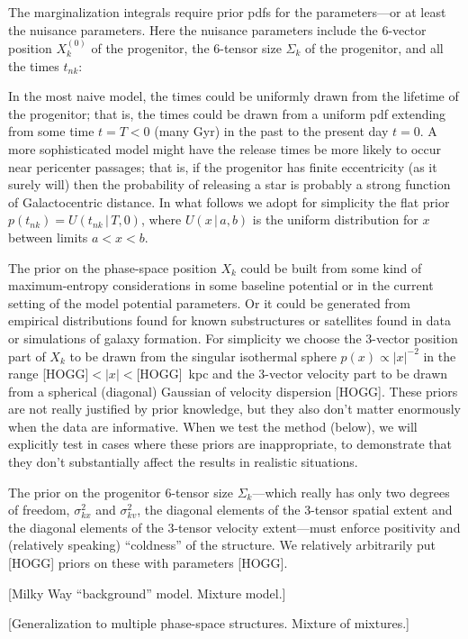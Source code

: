 \documentclass[letterpaper,12pt,preprint]{aastex}
\newcommand{\given}{\,|\,}
\begin{document}
The marginalization integrals require prior pdfs for the
parameters---or at least the nuisance parameters.  Here the nuisance
parameters include the 6-vector position $X_k^{(0)}$ of the
progenitor, the 6-tensor size $\Sigma_k$ of the progenitor, and all
the times $t_{nk}$:

In the most naive model, the times could be uniformly drawn from the
lifetime of the progenitor; that is, the times could be drawn from a
uniform pdf extending from some time $t=T<0$ (many Gyr) in the past to
the present day $t=0$.  A more sophisticated model might have the
release times be more likely to occur near pericenter passages; that
is, if the progenitor has finite eccentricity (as it surely will) then
the probability of releasing a star is probably a strong function of
Galactocentric distance.  In what follows we adopt for simplicity the
flat prior $p(t_{nk})=U(t_{nk}\given T,0)$, where $U(x\given a,b)$ is
the uniform distribution for $x$ between limits $a<x<b$.

The prior on the phase-space position $X_k$ could be built from some
kind of maximum-entropy considerations in some baseline potential or
in the current setting of the model potential parameters.  Or it could
be generated from empirical distributions found for known substructures or
satellites found in data or simulations of galaxy formation.  For
simplicity we choose the 3-vector position part of $X_k$ to be drawn
from the singular isothermal sphere $p(x)\propto |x|^{-2}$ in the
range [HOGG]$<|x|<$[HOGG]~kpc and the 3-vector velocity part to be
drawn from a spherical (diagonal) Gaussian of velocity dispersion
[HOGG].  These priors are not really justified by prior knowledge, but
they also don't matter enormously when the data are informative.  When
we test the method (below), we will explicitly test in cases where
these priors are inappropriate, to demonstrate that they don't
substantially affect the results in realistic situations.

The prior on the progenitor 6-tensor size $\Sigma_k$---which really
has only two degrees of freedom, $\sigma_{kx}^2$ and $\sigma_{kv}^2$, the
diagonal elements of the 3-tensor spatial extent and the diagonal
elements of the 3-tensor velocity extent---must enforce positivity and
(relatively speaking) ``coldness'' of the structure.  We relatively
arbitrarily put [HOGG] priors on these with parameters [HOGG].

[Milky Way ``background'' model.  Mixture model.]

[Generalization to multiple phase-space structures. Mixture of
  mixtures.]
\end{document}
